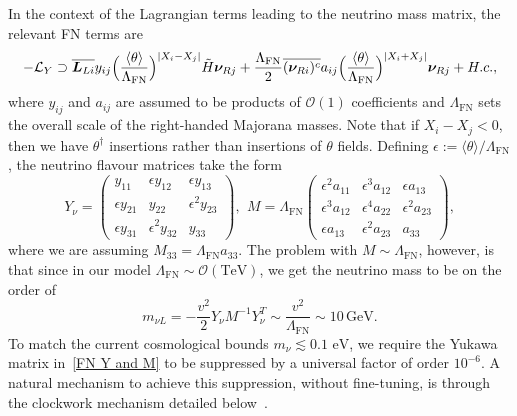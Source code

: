 \documentclass[11pt,letterpaper]{article}
\begin{document}
In the context of the Lagrangian terms leading to the neutrino mass matrix, the relevant FN terms are 
\begin{equation} \label{Yukawa Lagrangian FN}
    \small
    -\mathcal{L}_Y  \supset  \overline{\bm{L}_{L i}}  y_{ ij} \Big( \frac{\langle\theta\rangle}{\Lambda_{\text{FN}}}\Big)^{|X_i - X_j|} \tilde{H} \bm{\nu}_{R j}  +  \frac{\Lambda_{\text{FN}}}{2}  \overline{(\bm{\nu}_{Ri})^c} a_{ij}  \Big( \frac{\langle\theta\rangle}{\Lambda_{\text{FN}}}\Big)^{|X_i + X_j|} \bm{\nu}_{Rj} + H.c.,
\end{equation}
    where $ y_{ij}$ and $a_{ij}$ are assumed to be products of
$\mathcal{O}(1)$ coefficients and $\Lambda_{\text{FN}}$ sets the overall scale of the
right-handed Majorana masses.
Note that if
$X_i-X_j<0$, then we have $\theta^\dag$ insertions rather than insertions of
$\theta$ fields. 
Defining $\epsilon:=\langle\theta\rangle/\Lambda_{\text{FN}}$, the neutrino flavour matrices take the form 
\begin{equation} \label{FN Y and M}
     Y_{\nu} = 
    \begin{pmatrix}
         y_{11} &\epsilon  y_{12} & \epsilon  y_{13} \\
        \epsilon  y_{21}& y_{22}&\epsilon^{2} y_{23}\\
        \epsilon  y_{31}& \epsilon^{2} y_{32}& y_{33}
    \end{pmatrix}, \,\ 
    M =\Lambda_{\text{FN}}
    \begin{pmatrix}
    \epsilon^{2}a_{11}&\epsilon^{3}a_{12}&\epsilon a_{13}\\
    
    \epsilon^{3} a_{12} & \epsilon^{4} a_{22}& \epsilon^{2} a_{23}\\
    
    \epsilon a_{13} & \epsilon^{2}a_{23}&a_{33} 
    \end{pmatrix},
\end{equation}
where we are assuming $M_{33} =\Lambda_{\text{FN}} a_{33}$. The problem with $M\sim \Lambda_{\text{FN}}$, however, is that since in our model $\Lambda_{\text{FN}}\sim \mathcal{O}(\text{TeV})$, we get the neutrino mass to be on the order of 
\begin{equation}
    m_{\nu L} = -\frac{v^2}{2} Y_\nu M^{-1} Y_\nu^T \sim \frac{v^2}{\Lambda_{\text{FN}}} \sim 10 \,\text{GeV}.
\end{equation}
To match the current cosmological bounds $m_\nu \lesssim 0.1\text{~eV}$, we
require the Yukawa matrix in~\cref{FN Y and M} to be suppressed by
a universal factor of order $10^{-6}$. A natural mechanism to achieve this suppression,
without fine-tuning, is through the clockwork mechanism detailed
below~\cite{Kaplan:2015fuy,Giudice:2016yja,Choi:2015fiu,
  Park:2017yrn}. 
\end{document}
